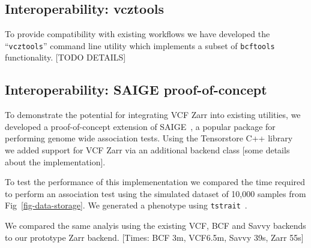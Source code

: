 \documentclass[a4paper,num-refs]{oup-contemporary}
\begin{document}
\subsection{Interoperability: vcztools}
To provide compatibility with existing workflows we have 
developed the ``\texttt{vcztools}'' command line utility which 
implements a subset of \texttt{bcftools} functionality.
[TODO DETAILS]

\subsection{Interoperability: SAIGE proof-of-concept}
To demonstrate the potential for integrating VCF Zarr into existing utilities,
we developed a proof-of-concept extension of SAIGE~\cite{zhou2018efficiently,
zhou2020scalable}, a popular package for performing genome wide
association tests. Using the Tensorstore C++ library~\cite{tensorstore}
we added support for VCF Zarr via an additional backend class [some details 
about the implementation].

To test the performance of this implemenentation we compared the time required
to perform an association test using the simulated dataset of 10,000 samples 
from Fig~\ref{fig-data-storage}. We generated a phenotype using
\texttt{tstrait}~\citep{tagami2024tstrait}.

We compared the same analyis using the existing VCF, BCF and Savvy backends
to our prototype Zarr backend. 
[Times: BCF 3m, VCF6.5m, Savvy 39s, Zarr 55s]





\end{document}

